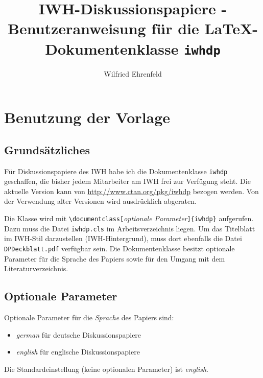 \documentclass[german]{iwhdp}
\begin{document}
\title[IWH-Diskussionspapiere - Benutzeranweisung\\für die \LaTeX-Dokumentenklasse \texttt{iwhdp}]
  {IWH-Diskussionspapiere -\\Benutzeranweisung für die \LaTeX-Dokumentenklasse \texttt{iwhdp}}
%
\author{Wilfried Ehrenfeld}
%
\dpnumber{\TeX{} \iwhdpversion}
%
%
%
\makeiwhtitle
\section{Benutzung der Vorlage}
%
\subsection{Grundsätzliches}
Für Diskussionspapiere des IWH habe ich die Dokumentenklasse \texttt{iwhdp} geschaffen, 
die bisher jedem Mitarbeiter am IWH frei zur Verfügung steht.
Die aktuelle Version kann von 
\url{http://www.ctan.org/pkg/iwhdp}
bezogen werden. %
Von der Verwendung alter Versionen wird ausdrücklich abgeraten.

Die Klasse wird mit
\verb+\documentclass[+\emph{optionale Parameter}\verb+]{iwhdp}+
aufgerufen.
Dazu muss die Datei \texttt{iwhdp.cls} im Arbeitsverzeichnis liegen.
Um das Titelblatt im IWH-Stil darzustellen (IWH-Hintergrund), muss dort ebenfalls die Datei \texttt{DP\textunderscore Deckblatt.pdf} verfügbar sein.
Die Dokumentenklasse besitzt optionale Parameter für 
die Sprache des Papiers sowie für den Umgang mit dem Literaturverzeichnis.


\subsection{Optionale Parameter}
%
Optionale Parameter für die \textit{Sprache} des Papiers sind:
%
\begin{itemize}
\item \emph{german} für deutsche Diskussionspapiere
\item \emph{english} für englische Diskussionspapiere
\end{itemize}
Die Standardeinstellung (keine optionalen Parameter) ist \emph{english}. 
\end{document}
